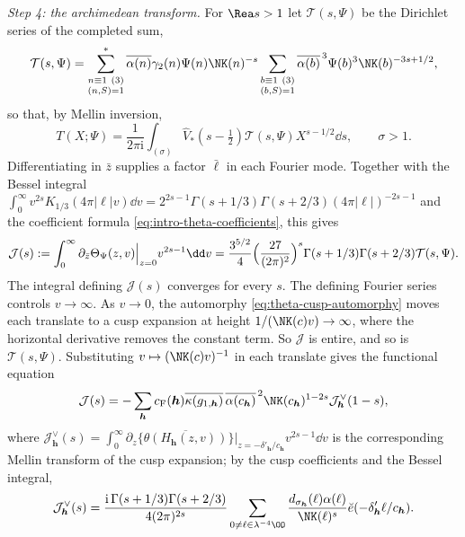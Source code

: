 \emph{Step 4: the archimedean transform.} For $\Rea s>1$ let $\mathcal T(s,\Psi)$ be the
Dirichlet series of the completed sum,
\[
 \mathcal T(s,\Psi)=
 \sum_{\substack{n\equiv1\ (3)\\(n,S)=1}}^*
   \overline{\alpha(n)}\gamma_2(n)\Psi(n)\NK(n)^{-s}
 \sum_{\substack{b\equiv1\ (3)\\(b,S)=1}}\overline{\alpha(b)}^{\,3}
   \Psi(b)^3\NK(b)^{-3s+1/2},
\]
so that, by Mellin inversion,
\begin{equation}\label{eq:theta-mellin-inversion}
 T(X;\Psi)=\frac1{2\pi \mathrm i}\int_{(\sigma)}
 \widehat V_*(s-\tfrac12)\mathcal T(s,\Psi)X^{s-1/2}\dd s,
 \qquad \sigma>1.
\end{equation}
Differentiating in $\bar z$ supplies a factor $\bar\ell$ in each Fourier mode. Together with
the Bessel integral $\int_0^\infty v^{2s}K_{1/3}(4\pi|\ell|v)\dd v
=2^{2s-1}\Gamma(s+1/3)\Gamma(s+2/3)(4\pi|\ell|)^{-2s-1}$ \cite[(10.43.19)]{DLMF} and the
coefficient formula \eqref{eq:intro-theta-coefficients}, this gives
\begin{equation}\label{eq:ray-mellin}
\mathcal J(s):=\int_0^\infty\partial_{\bar z}\Theta_\Psi(z,v)\Bigr|_{z=0}v^{2s-1}\dd v
=\frac{3^{5/2}}4
       \Bigl(\frac{27}{(2\pi)^2}\Bigr)^s
       \Gamma(s+1/3)\Gamma(s+2/3)\mathcal T(s,\Psi).
\end{equation}
The integral defining $\mathcal J(s)$ converges for every $s$. The defining Fourier series controls
$v\to\infty$. As $v\to0$, the automorphy \eqref{eq:theta-cusp-automorphy} moves each translate
to a cusp expansion at height $1/(\NK(c)v)\to\infty$, where the horizontal derivative removes the
constant term. So $\mathcal J$ is entire, and so is $\mathcal T(s,\Psi)$. Substituting
$v\mapsto(\NK(c)v)^{-1}$ in each translate gives the functional equation
\begin{equation}\label{eq:theta-mellin-functional-equation}
 \mathcal J(s)=-\sum_{\boldsymbol h} c_{\mathrm F}(\boldsymbol h)\overline{\kappa(g_{1,\boldsymbol h})}\,
       \overline{\alpha(c_{\boldsymbol h})}^{\,2}\NK(c_{\boldsymbol h})^{1-2s}\mathcal J_{\boldsymbol h}^\vee(1-s),
\end{equation}
where $\mathcal J^\vee_{\boldsymbol h}(s)=\int_0^\infty\partial_z\{\overline{\theta(H_{\boldsymbol h}(z,v))}\}
\big|_{z=-\delta'_{\boldsymbol h}/c_{\boldsymbol h}}v^{2s-1}\dd v$ is the corresponding Mellin
transform of the cusp expansion; by the cusp coefficients and the Bessel integral,
\begin{equation}\label{eq:dual-cusp-mellin-series}
 \mathcal J_{\boldsymbol h}^\vee(s)=\frac{\mathrm i\,\Gamma(s+1/3)\Gamma(s+2/3)}{4(2\pi)^{2s}}
 \sum_{0\ne\ell\in\lambda^{-4}\OO}
 \frac{d_{\sigma_{\boldsymbol h}}(\ell)\alpha(\ell)}{\NK(\ell)^s}
 \breve e(-\delta'_{\boldsymbol h}\ell/c_{\boldsymbol h}).
\end{equation}
